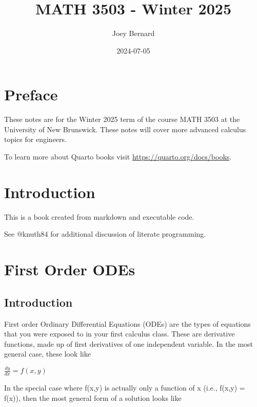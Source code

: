 \documentclass[
  letterpaper,
]{report}
\title{MATH 3503 - Winter 2025}
\author{Joey Bernard}
\date{2024-07-05}
\renewcommand*\contentsname{Table of contents}
\newcommand\contentsname{Table of contents}
\begin{document}
\maketitle

\renewcommand*\contentsname{Table of contents}
{
\hypersetup{linkcolor=}
\setcounter{tocdepth}{2}
\tableofcontents
}


\chapter*{Preface}\label{preface}


These notes are for the Winter 2025 term of the course MATH 3503 at the
University of New Brunswick. These notes will cover more advanced
calculus topics for engineers.

To learn more about Quarto books visit
\url{https://quarto.org/docs/books}.


\chapter{Introduction}\label{introduction}

This is a book created from markdown and executable code.

See @knuth84 for additional discussion of literate programming.


\chapter{First Order ODEs}\label{first-order-odes}

\section{Introduction}\label{introduction-1}

First order Ordinary Differential Equations (ODEs) are the types of
equations that you were exposed to in your first calculus class. These
are derivative functions, made up of first derivatives of one
independent variable. In the most general case, these look like

\(\frac{dy}{dx} = f(x,y)\)

In the special case where f(x,y) is actually only a function of x (i.e.,
f(x,y) = f(x)), then the most general form of a solution looks like
\end{document}
